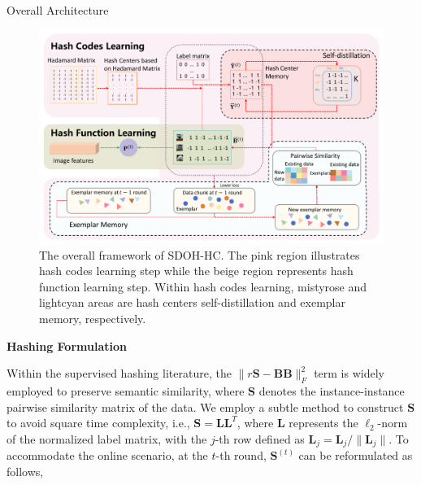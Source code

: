 \documentclass[final]{beamer}
\newlength{\colwidth}
\newcommand{\mymethodname}{SDOH-HC}
\begin{document}
\begin{frame}[t]
\begin{columns}[t]
\begin{column}{\colwidth}
					\begin{block}{Overall Architecture}
						\begin{figure}
							\centering
							\includegraphics[width=1\colwidth]{figures/MM_SDOH-HC-framework}
							\vspace{-2cm}
							\caption{The overall framework of \mymethodname. The pink region illustrates hash codes learning step while the beige region represents hash function learning step. Within hash codes learning, mistyrose and lightcyan areas are hash centers self-distillation and exemplar memory, respectively.} 
							\label{framework}
							\vspace{-1.2cm}
						\end{figure}
					\end{block}




					\textbf{Hashing Formulation}
					
					
					Within the supervised hashing literature, the $\|r\mathbf{S}-\mathbf{B}\mathbf{B}\|_{F}^{2}$ term is widely employed to preserve semantic similarity, where $\mathbf{S}$ denotes the instance-instance pairwise similarity matrix of the data. We employ a subtle method to construct $\mathbf{S}$ to avoid square time complexity, i.e., $\mathbf{S} = {\mathbf{L}} {\mathbf{L}}^{T}$, where ${\mathbf{L}}$ represents the $\ell_{2}$-norm of the normalized label matrix, with the $j$-th row defined as $\mathbf{L}_{j} = \mathbf{L}_{j}/\|\mathbf{L}_{j}\|$. To accommodate the online scenario, at the $t$-th round, $\mathbf{S}^{(t)}$ can be reformulated as follows,
					
					\vspace{-3mm}
					

\end{column}
\end{columns}
\end{frame}
\end{document}
